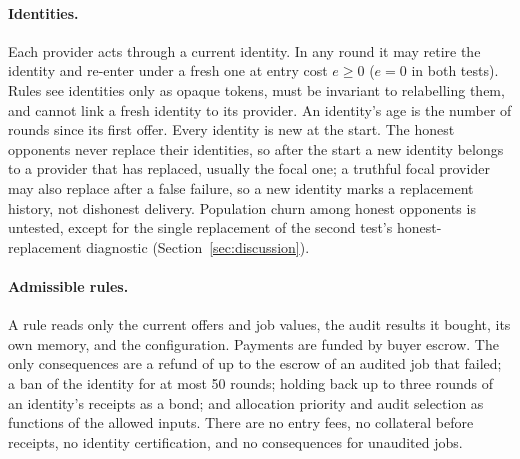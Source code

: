 \documentclass[11pt]{article}
\begin{document}
\paragraph{Identities.} Each provider acts through a current identity. In any round it may retire the identity and re-enter under a fresh one at entry cost $e \ge 0$ ($e = 0$ in both tests). Rules see identities only as opaque tokens, must be invariant to relabelling them, and cannot link a fresh identity to its provider. An identity's age is the number of rounds since its first offer. Every identity is new at the start. The honest opponents never replace their identities, so after the start a new identity belongs to a provider that has replaced, usually the focal one; a truthful focal provider may also replace after a false failure, so a new identity marks a replacement history, not dishonest delivery. Population churn among honest opponents is untested, except for the single replacement of the second test's honest-replacement diagnostic (Section~\ref{sec:discussion}).

\paragraph{Admissible rules.} A rule reads only the current offers and job values, the audit results it bought, its own memory, and the configuration. Payments are funded by buyer escrow. The only consequences are a refund of up to the escrow of an audited job that failed; a ban of the identity for at most 50 rounds; holding back up to three rounds of an identity's receipts as a bond; and allocation priority and audit selection as functions of the allowed inputs. There are no entry fees, no collateral before receipts, no identity certification, and no consequences for unaudited jobs.
\end{document}
